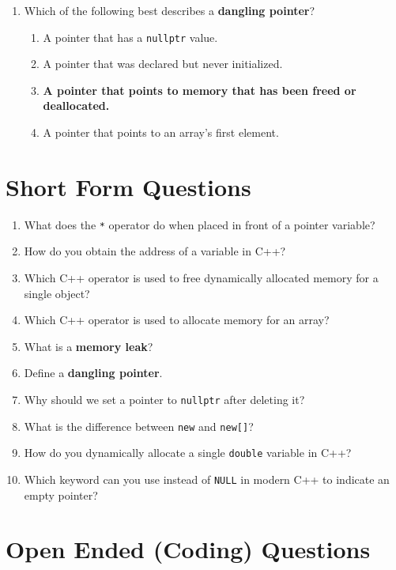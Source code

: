 \documentclass[a4paper,12pt]{article}
\begin{document}
\begin{enumerate}
    \item Which of the following best describes a \textbf{dangling pointer}?
    \begin{enumerate}
        \item A pointer that has a \texttt{nullptr} value.
        \item A pointer that was declared but never initialized.
        \item \textbf{A pointer that points to memory that has been freed or deallocated.}
        \item A pointer that points to an array's first element.
    \end{enumerate}

\end{enumerate}

\section{Short Form Questions}

\begin{enumerate}
    \item What does the \texttt{*} operator do when placed in front of a pointer variable?
    \item How do you obtain the address of a variable in C++?
    \item Which C++ operator is used to free dynamically allocated memory for a single object?
    \item Which C++ operator is used to allocate memory for an array?
    \item What is a \textbf{memory leak}?
    \item Define a \textbf{dangling pointer}.
    \item Why should we set a pointer to \texttt{nullptr} after deleting it?
    \item What is the difference between \texttt{new} and \texttt{new[]}?
    \item How do you dynamically allocate a single \texttt{double} variable in C++?
    \item Which keyword can you use instead of \texttt{NULL} in modern C++ to indicate an empty pointer?
\end{enumerate}

\section{Open Ended (Coding) Questions}
\end{document}
